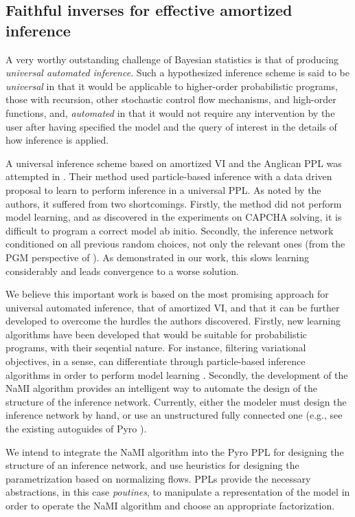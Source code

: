 \subsection{Faithful inverses for effective amortized inference}
A very worthy outstanding challenge of Bayesian statistics is that of producing \emph{universal automated inference}. Such a hypothesized inference scheme is said to be \emph{universal} in that it would be applicable to higher-order probabilistic programs, those with recursion, other stochastic control flow mechanisms, and high-order functions, and, \emph{automated} in that it would not require any intervention by the user after having specified the model and the query of interest in the details of how inference is applied.

A universal inference scheme based on amortized VI and the Anglican PPL \citep{wood2014new} was attempted in \citet{LeEtAl2016}. Their method used particle-based inference with a data driven proposal to learn to perform inference in a universal PPL. As noted by the authors, it suffered from two shortcomings. Firstly, the method did not perform model learning, and as discovered in the experiments on CAPCHA solving, it is difficult to program a correct model ab initio. Secondly, the inference network conditioned on all previous random choices, not only the relevant ones (from the PGM perspective of \citet{WebbEtAl2018}). As demonstrated in our work, this slows learning considerably and leads convergence to a worse solution.

We believe this important work is based on the most promising approach for universal automated inference, that of amortized VI, and that it can be further developed to overcome the hurdles the authors discovered. Firstly, new learning algorithms have been developed that would be suitable for probabilistic programs, with their seqential nature. For instance, filtering variational objectives, in a sense, can differentiate through particle-based inference algorithms in order to perform model learning \citep{MaddisonEtAl2017, LeEtAl2017, NaessethEtAl2017}. Secondly, the development of the NaMI algorithm provides an intelligent way to automate the design of the structure of the inference network. Currently, either the modeler must design the inference network by hand, or use an unstructured fully connected one (e.g., see the existing autoguides of Pyro \citep{bingham2018pyro}).

We intend to integrate the NaMI algorithm into the Pyro PPL for designing the structure of an inference network, and use heuristics for designing the parametrization based on normalizing flows. PPLs provide the necessary abstractions, in this case \emph{poutines}, to manipulate a representation of the model in order to operate the NaMI algorithm and choose an appropriate factorization.

